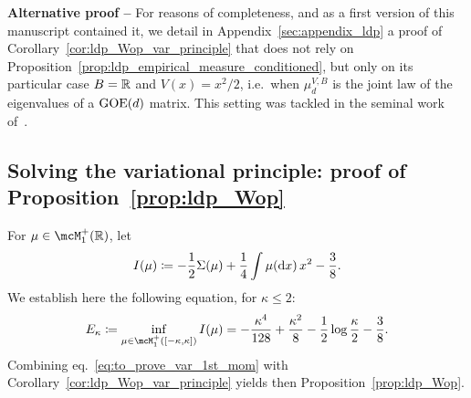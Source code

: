  \myskip
 \textbf{Alternative proof --}
 For reasons of completeness, and as a first version of this manuscript contained it, we detail in Appendix~\ref{sec:appendix_ldp} a proof of Corollary~\ref{cor:ldp_Wop_var_principle} 
 that does not rely on Proposition~\ref{prop:ldp_empirical_measure_conditioned}, but only on its particular case $B = \mathbb{R}$ and $V(x) = x^2/2$, i.e.\ when $\mu_{d}^{V,B}$ is the joint law of the eigenvalues of a $\mathrm{GOE}(d)$ matrix.
 This setting was tackled in the seminal work of~\cite{arous1997large}.
 
 \subsection{Solving the variational principle: proof of Proposition~\ref{prop:ldp_Wop}}\label{subsec:var_principle_1st_mom}

 For $\mu \in \mcM_1^+(\bbR)$, let 
\begin{equation}\label{eq:def_I}
    I(\mu) \coloneqq -\frac{1}{2} \Sigma(\mu) + \frac{1}{4} \int \mu(\mathrm{d} x) \, x^2 - \frac{3}{8}.
\end{equation}
 We establish here the following equation, for $\kappa \leq 2$: 
 \begin{align}\label{eq:to_prove_var_1st_mom}
    E_\kappa \coloneqq \inf_{\mu \in \mcM_1^+([-\kappa, \kappa])} I(\mu) = 
    - \frac{\kappa^4}{128} + \frac{\kappa^2}{8} - \frac{1}{2} \log \frac{\kappa}{2} - \frac{3}{8}.
 \end{align}
 Combining eq.~\eqref{eq:to_prove_var_1st_mom} with Corollary~\ref{cor:ldp_Wop_var_principle} yields then Proposition~\ref{prop:ldp_Wop}.

